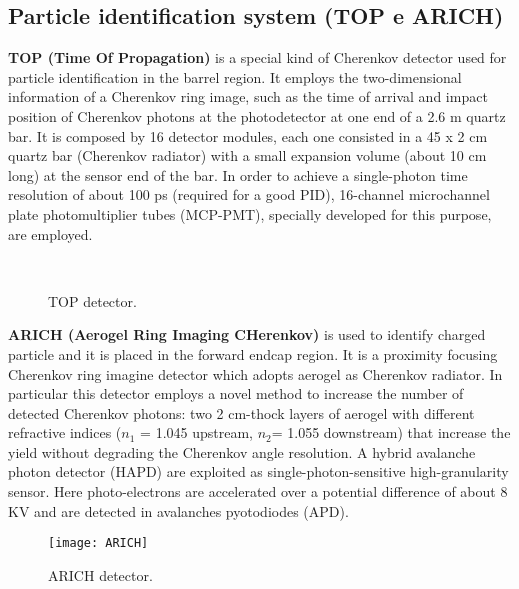 
\subsection{Particle identification system (TOP e ARICH)}

\textbf{TOP (Time Of Propagation)} is a special kind of Cherenkov detector used for particle identification in the barrel region. It employs the two-dimensional information of a Cherenkov ring image, such as the time of arrival and impact position of Cherenkov photons at the photodetector at one end of a 2.6 m quartz bar. It is composed by 16 detector modules, each one consisted in a 45 x 2 cm quartz bar (Cherenkov radiator) with a small expansion volume (about 10 cm long) at the sensor end of the bar. In order to achieve a single-photon time resolution of about 100 ps (required for a good PID), 16-channel microchannel plate photomultiplier tubes (MCP-PMT), specially developed for this purpose, are employed.\\

\begin{figure}
\centering
{}\quad
{}\\
\caption{TOP detector.}
\label{TOP}
\end{figure}

\textbf{ARICH (Aerogel Ring Imaging CHerenkov)} is used to identify charged particle and it is placed in the forward endcap region. It is a proximity focusing Cherenkov ring imagine detector which adopts aerogel as Cherenkov radiator. In particular this detector employs a novel method to increase the number of detected Cherenkov photons: two 2 cm-thock layers of aerogel with different refractive indices ($n_{1}$ = 1.045 upstream, $n_{2}$= 1.055 downstream) that increase the yield without degrading the Cherenkov angle resolution.
A hybrid avalanche photon detector (HAPD) are exploited as single-photon-sensitive high-granularity sensor. Here photo-electrons are accelerated over a potential difference of about 8 KV and are detected in avalanches pyotodiodes (APD).\\

\begin{figure}
\centering
\texttt{[image: ARICH]}
\caption{ARICH detector.}
\label{ARICH}
\end{figure}

